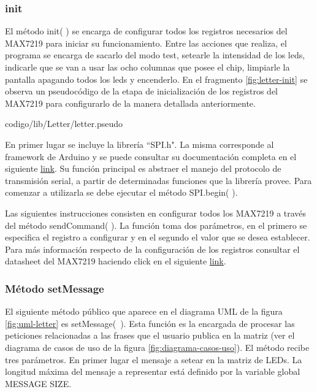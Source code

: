         \subsubsection{init}
        El método init( ) se encarga de configurar todos los registros necesarios del MAX7219 para iniciar su funcionamiento. Entre las acciones que realiza, el programa se encarga de sacarlo del modo test, setearle la intensidad de los leds, indicarle que se van a usar las ocho columnas que posee el chip, limpiarle la pantalla apagando todos los leds y encenderlo. En el fragmento \ref{fig:letter-init} se observa un pseudocódigo de la etapa de inicialización de los registros del MAX7219 para configurarlo de la manera detallada anteriormente.

        
                     {codigo/lib/Letter/letter.pseudo}

        En primer lugar se incluye la librería ``SPI.h". La misma corresponde al framework de Arduino y se puede consultar su documentación completa en el siguiente \href{https://github.com/arduino/Arduino/blob/master/hardware/arduino/avr/libraries/SPI/src/SPI.h}{link}. Su función principal es abstraer el manejo del protocolo de transmisión serial, a partir de determinadas funciones que la librería provee. Para comenzar a utilizarla se debe ejecutar el método SPI.begin( ).
    
        Las siguientes instrucciones consisten en configurar todos los MAX7219 a través del método sendCommand( ). La función toma dos parámetros, en el primero se especifica el registro a configurar y en el segundo el valor que se desea establecer. Para más información respecto de la configuración de los registros consultar el datasheet del MAX7219 haciendo click en el siguiente \href{https://datasheets.maximintegrated.com/en/ds/MAX7219-MAX7221.pdf}{link}.

        \subsubsection{Método setMessage}
        El siguiente método público que aparece en el diagrama UML de la figura \ref{fig:uml-letter} es \mbox{setMessage( )}. Esta función es la encargada de procesar las peticiones relacionadas a las frases que el usuario publica en la matriz (ver el diagrama de casos de uso de la figura \ref{fig:diagrama-casos-uso}). El método recibe tres parámetros. En primer lugar el mensaje a setear en la matriz de LEDs. La longitud máxima del mensaje a representar está definido por la variable global MESSAGE SIZE.

